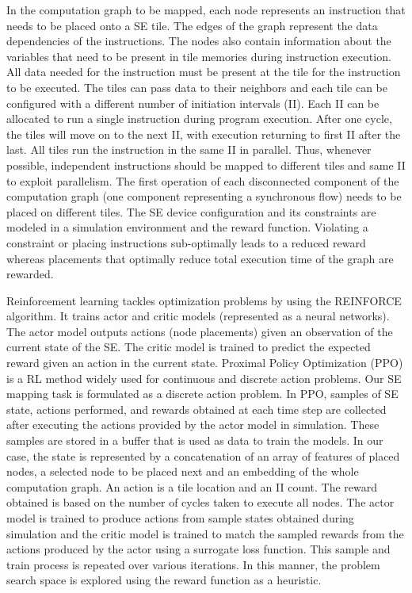 In the computation graph to be mapped, each node represents an instruction that needs to be placed onto a SE tile. 
The edges of the graph represent the data dependencies of the instructions. 
The nodes also contain information about the variables that need to be present in tile memories during instruction execution. 
All data needed for the instruction must be present at the tile for the instruction to be executed. 
The tiles can pass data to their neighbors and each tile can be configured with a different number of initiation intervals (II). 
Each II can be allocated to run a single instruction during program execution. 
After one cycle, the tiles will move on to the next II, with execution returning to first II after the last. 
All tiles run the instruction in the same II in parallel. 
Thus, whenever possible, independent instructions should be mapped to different tiles and same II to exploit parallelism. 
The first operation of each disconnected component of the computation graph (one component representing a synchronous flow) needs to be placed on different tiles. 
The SE device configuration and its constraints are modeled in a simulation environment and the reward function. 
Violating a constraint or placing instructions sub-optimally leads to a reduced reward whereas placements that optimally reduce total execution time of the graph are rewarded. 

Reinforcement learning tackles optimization problems by using the REINFORCE algorithm. 
It trains actor and critic models (represented as a neural networks). 
The actor model outputs actions (node placements) given an observation of the current state of the SE. 
The critic model is trained to predict the expected reward given an action in the current state. 
Proximal Policy Optimization (PPO) is a RL method widely used for continuous and discrete action problems. 
Our SE mapping task is formulated as a discrete action problem. 
In PPO, samples of SE state, actions performed, and rewards obtained at each time step are collected after executing the actions provided by the actor model in simulation. 
These samples are stored in a buffer that is used as data to train the models. In our case, the state is represented by a concatenation of an array of features of placed nodes, a selected node to be placed next and an embedding of the whole computation graph. An action is a tile location and an II count. The reward obtained is based on the number of cycles taken to execute all nodes. The actor model is trained to produce actions from sample states obtained during simulation and the critic model is trained to match the sampled rewards from the actions produced by the actor using a surrogate loss function. This sample and train process is repeated over various iterations. In this manner, the problem search space is explored using the reward function as a heuristic.  

